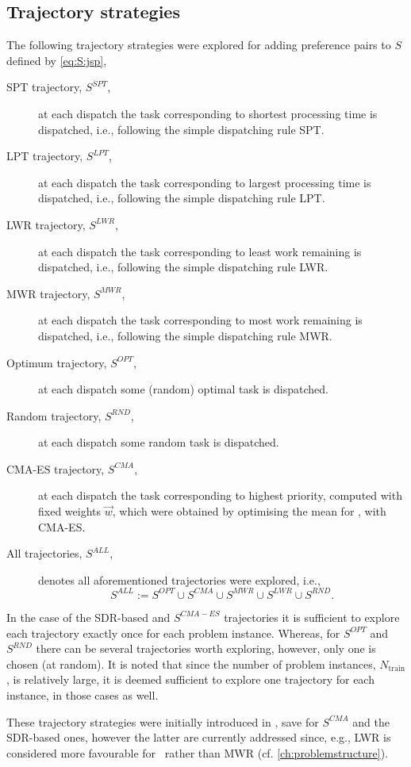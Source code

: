 \subsection{Trajectory strategies}
The following trajectory strategies were explored for adding preference pairs to $S$ defined by \cref{eq:S:jsp},
\begin{description}
\item[SPT trajectory, $S^{SPT}$,] at each dispatch the task corresponding to shortest processing time is dispatched, i.e., following the simple dispatching rule SPT.
\item[LPT trajectory, $S^{LPT}$,] at each dispatch the task corresponding to largest processing time is dispatched, i.e., following the simple dispatching rule LPT.
\item[LWR trajectory, $S^{LWR}$,] at each dispatch the task corresponding to least work remaining is dispatched, i.e., following the simple dispatching rule LWR.
\item[MWR trajectory, $S^{MWR}$,] at each dispatch the task corresponding to most work remaining is dispatched, i.e., following the simple dispatching rule MWR.
\item[Optimum trajectory, $S^{OPT}$,] at each dispatch some (random) optimal task is dispatched.
\item[Random trajectory, $S^{RND}$,] at each dispatch some random task is dispatched.
\item[CMA-ES trajectory, $S^{CMA}$,] at each dispatch the task corresponding to highest priority, computed with fixed weights $\vec{w}$, which were obtained by optimising the mean for \fullnamerho, with CMA-ES. 
\item[All trajectories, $S^{ALL}$,] denotes all aforementioned trajectories were explored, i.e., 
\begin{equation}
S^{ALL}:=S^{OPT}\cup S^{CMA}\cup S^{MWR}\cup S^{LWR} \cup S^{RND}.
\end{equation}
\end{description}
In the case of the SDR-based and $S^{CMA-ES}$ trajectories it is sufficient to explore each trajectory exactly once for each problem instance. Whereas, for $S^{OPT}$ and $S^{RND}$ there can be several trajectories worth exploring, however, only one is chosen (at random). It is noted that since the number of problem instances, $N_{\text{train}}$, is relatively large, it is deemed sufficient to explore one trajectory for each instance, in those cases as well.

These trajectory strategies were initially introduced in \citet{InRu15a}, save 
for $S^{CMA}$ and the SDR-based ones, however the latter are currently 
addressed since, e.g., LWR is considered more favourable for \fsp\ rather than 
MWR (cf. \cref{ch:problemstructure}). 

